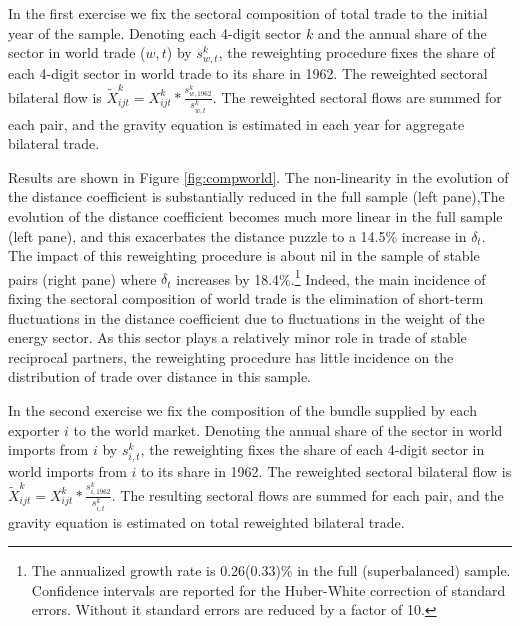 \documentclass[12pt,twoside,a4paper,notitlepage]{article}
\begin{document}

In the first exercise we fix the sectoral composition of total trade to the initial year of the sample.
Denoting each 4-digit sector $k$ and the annual share of the sector in world trade ($w,t$) by $s^{k}_{w,t}$, the reweighting procedure fixes the share of each 4-digit sector in world trade to its share in 1962.
The reweighted sectoral bilateral flow is $\tilde{X}^k_{ijt}=X^k_{ijt}*\frac{s^k_{w,1962}}{s^k_{w,t}}$.
The reweighted sectoral flows are summed for each pair, and the gravity equation is estimated in each year for aggregate bilateral trade.

Results are shown in Figure \ref{fig:compworld}.
 The non-linearity in the evolution of the distance coefficient is substantially reduced in the full sample (left pane),\fi The evolution of the distance coefficient becomes much more linear in the full sample (left pane), and this exacerbates the distance puzzle to a 14.5\% increase in $\delta_t$.
The impact of this reweighting procedure is about nil in the sample of stable pairs (right pane) where $\delta_t$ increases by 18.4\%.\footnote{The annualized growth rate is 0.26(0.33)\% in the full (superbalanced) sample.
Confidence intervals are reported for the Huber-White correction of standard errors.
Without it standard errors are reduced by a factor of 10.}
Indeed, the main incidence of fixing the sectoral composition of world trade is the elimination of short-term fluctuations in the distance coefficient due to fluctuations in the weight of the energy sector.
As this sector plays a relatively minor role in trade of stable reciprocal partners, the reweighting procedure has little incidence on the distribution of trade over distance in this sample.

In the second exercise we fix the composition of the bundle supplied by each exporter $i$ to the world market.
Denoting the annual share of the sector in world imports from $i$ by $s^{k}_{i,t}$, the reweighting fixes the share of each 4-digit sector in world imports from $i$ to its share in 1962.
The reweighted sectoral bilateral flow is $\tilde{X}^k_{ijt}=X^k_{ijt}*\frac{s^k_{i,1962}}{s^k_{i,t}}$.
The resulting sectoral flows are summed for each pair, and the gravity equation is estimated on total reweighted bilateral trade.
\end{document}
